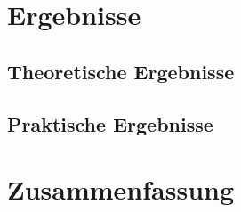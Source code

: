 \documentclass[sigconf]{acmart}
\theoremstyle{break}
\begin{document}



\section{Ergebnisse}
\label{ergebnisse}
\subsection{Theoretische Ergebnisse}



\subsection{Praktische Ergebnisse}

\section{Zusammenfassung}
\end{document}
